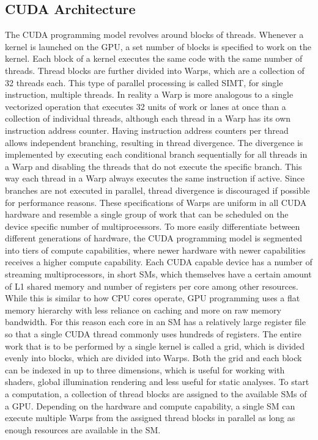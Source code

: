 \subsection{CUDA Architecture}
The CUDA programming model revolves around blocks of threads. Whenever a kernel is launched on the GPU, a set number of blocks is specified to work on the kernel. Each block of a kernel executes the same code with the same number of threads.
Thread blocks are further divided into Warps, which are a collection of 32 threads each. This type of parallel processing is called SIMT, for single instruction, multiple threads.
In reality a Warp is more analogous to a single vectorized operation that executes 32 units of work or lanes at once than a collection of individual threads, although each thread in a Warp has its own instruction address counter. Having instruction address counters per thread allows independent branching, resulting in thread divergence. The divergence is implemented by executing each conditional branch sequentially for all threads in a Warp and disabling the threads that do not execute the specific branch.
This way each thread in a Warp always executes the same instruction if active. Since branches are not executed in parallel, thread divergence is discouraged if possible for performance reasons.
These specifications of Warps are uniform in all CUDA hardware and resemble a single group of work that can be scheduled on the device specific number of multiprocessors.
To more easily differentiate between different generations of hardware, the CUDA programming model is segmented into tiers of compute capabilities, where newer hardware with newer capabilities receives a higher compute capability.
Each CUDA capable device has a number of streaming multiprocessors, in short SMs, which themselves have a certain amount of L1 shared memory and number of registers per core among other resources. 
While this is similar to how CPU cores operate, GPU programming uses a flat memory hierarchy with less reliance on caching and more on raw memory bandwidth. For this reason each core in an SM has a relatively large register file so that a single CUDA thread commonly uses hundreds of registers.
The entire work that is to be performed by a single kernel is called a grid, which is divided evenly into blocks, which are divided into Warps. Both the grid and each block can be indexed in up to three dimensions, which is useful for working with shaders, global illumination rendering and less useful for static analyses.
To start a computation, a collection of thread blocks are assigned to the available SMs of a GPU. Depending on the hardware and compute capability, a single SM can execute multiple Warps from the assigned thread blocks in parallel as long as enough resources are available in the SM.
